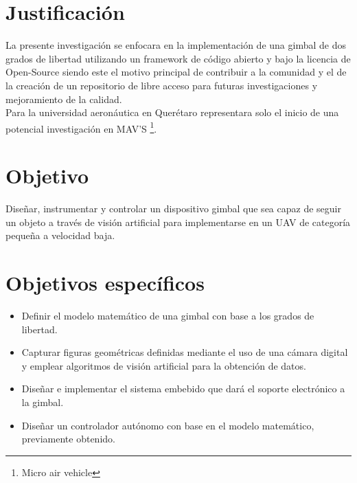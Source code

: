 \section{Justificación}
La presente investigación se enfocara en la implementación de una gimbal de dos grados
de libertad utilizando un framework de código abierto y bajo la licencia de Open-Source
siendo este el motivo principal de contribuir a la comunidad y el de la creación de
un repositorio de libre acceso para futuras investigaciones y mejoramiento de la calidad.\\
Para la universidad aeronáutica en Querétaro representara solo el inicio de una potencial
investigación en MAV'S \footnote{Micro air vehicle}.

\section{Objetivo}
Diseñar, instrumentar y controlar un dispositivo gimbal que sea capaz de seguir un objeto a través de visión artificial para
implementarse en un UAV de categoría pequeña a velocidad baja.

\section{Objetivos específicos}
\begin{itemize}
	\item Definir el modelo matemático de una gimbal con base a los grados de libertad.
	\item Capturar figuras geométricas definidas  mediante el uso de una cámara digital y emplear algoritmos de visión artificial para la obtención de datos.
	\item Diseñar e implementar el sistema embebido que dará el soporte electrónico a la gimbal.
	\item Diseñar un controlador autónomo con base en el modelo matemático, previamente obtenido.
\end{itemize}

